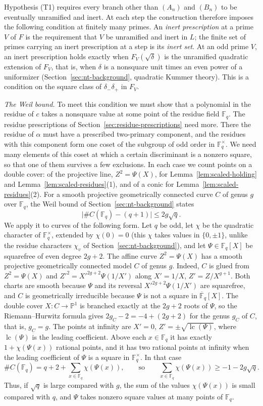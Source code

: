 \documentclass[11pt]{article}
\theoremstyle{plain}
\theoremstyle{definition}
\theoremstyle{remark}
\newcommand{\F}{\mathbb F}
\begin{document}
Hypothesis (T1) requires every branch other than $(A_n)$ and $(B_n)$ to
be eventually unramified and inert.  At
each step the construction therefore imposes the following condition at
finitely many primes.  An \emph{inert prescription} at a prime $V$ of $F$
is the requirement that $V$ be unramified and inert in $L$; the finite set
of primes carrying an inert prescription at a step is its \emph{inert
set}.  At an odd prime $V$, an inert prescription holds exactly when
$F_V(\sqrt\delta)$ is the unramified quadratic extension of $F_V$, that is,
when $\delta$ is a nonsquare unit times an even power of a uniformizer
(Section~\ref{sec:nt-background}, quadratic Kummer theory).  This is a
condition on the square class of $\delta_-\delta_+$ in $F_V$.

\emph{The Weil bound.}  To meet this condition we must show that a
polynomial in the residue of $c$ takes a nonsquare value at some point of
the residue field $\F_q$.  The residue prescriptions of
Section~\ref{sec:residue-prescriptions} need more.  There the residue of
$\alpha$ must have a prescribed two-primary component, and the residues
with this component form one coset of the subgroup of odd order in
$\F_q^\times$.  We need many elements of this coset at which a certain
discriminant is a nonzero square, so that one of them survives a few
exclusions.  In each case we count points on a double cover: of the
projective line, $Z^2=\Psi(X)$, for Lemma~\ref{lem:scaled-holding} and
Lemma~\ref{lem:scaled-residues}(1), and of a conic for
Lemma~\ref{lem:scaled-residues}(2).  For a smooth projective
geometrically connected curve $C$ of genus $g$ over $\F_q$, the Weil bound
of Section~\ref{sec:nt-background} states
\[
 \bigl|\#C(\F_q)-(q+1)\bigr|\le2g\sqrt q .
\]
We apply it to curves of the following form.  Let $q$
be odd, let $\chi$ be the quadratic character of $\F_q^\times$, extended by
$\chi(0)=0$ (this $\chi$ takes values in $\{0,\pm1\}$, unlike the residue
characters $\chi_v$ of Section~\ref{sec:nt-background}), and let $\Psi\in\F_q[X]$ be squarefree of even degree $2g+2$.
The affine curve $Z^2=\Psi(X)$ has a smooth projective geometrically connected
model $C$ of genus $g$.  Indeed, $C$ is glued from $Z^2=\Psi(X)$ and
$Z'^2=X'^{2g+2}\Psi(1/X')$ along $X'=1/X$, $Z'=Z/X^{g+1}$.  Both charts are
smooth because $\Psi$ and its reversal $X'^{2g+2}\Psi(1/X')$ are
squarefree, and $C$ is geometrically irreducible because $\Psi$ is not a
square in $\overline{\F}_q[X]$.  The double cover $X\colon C\to\mathbb P^1$
is branched exactly at the $2g+2$ roots of $\Psi$, so the
Riemann--Hurwitz formula gives $2g_C-2=-4+(2g+2)$ for the genus $g_C$ of
$C$, that is, $g_C=g$.  The points at infinity are $X'=0$,
$Z'=\pm\sqrt{\operatorname{lc}(\Psi)}$, where $\operatorname{lc}(\Psi)$ is
the leading coefficient.  Above each $x\in\F_q$ it has exactly
$1+\chi(\Psi(x))$ rational points, and it has two rational points at infinity
when the leading coefficient of $\Psi$ is a square in $\F_q^\times$.  In that
case
\[
 \#C(\F_q)=q+2+\sum_{x\in\F_q}\chi(\Psi(x)),\qquad\text{so}\qquad
 \sum_{x\in\F_q}\chi(\Psi(x))\ge-1-2g\sqrt q .
\]
Thus, if $\sqrt q$ is large compared with $g$, the sum of the values
$\chi(\Psi(x))$ is small compared with $q$, and $\Psi$ takes nonzero square
values at many points of $\F_q$.
\end{document}
